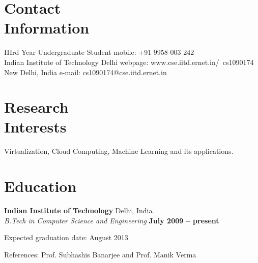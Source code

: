 \documentclass[margin,line]{resume}
\begin{document}
\begin{resume}

    \section{\mysidestyle Contact\\Information}

    IIIrd Year Undergraduate Student \hfill mobile: +91 9958 003 242 \vspace{0mm}\\\vspace{0mm}%
    Indian Institute of Technology Delhi \hfill webpage: www.cse.iitd.ernet.in/~cs1090174 \vspace{0mm}\\\vspace{0mm}%
    New Delhi, India \hfill e-mail: cs1090174@cse.iitd.ernet.in  \vspace{0mm}\\\vspace{-4.5mm}%


    \section{\mysidestyle Research\\Interests}

    Virtualization, Cloud Computing, Machine Learning and its applications.

    \section{\mysidestyle Education}

    \textbf{Indian Institute of Technology} Delhi, India \vspace{2mm}\\\vspace{1mm}%
    \textsl{B.Tech in Computer Science and Engineering} \hfill \textbf{ July 2009 -- present}\vspace{-3mm}\\\vspace{-1mm}%
    \begin{list2}
        \item Expected graduation date: August 2013
        \item References: Prof. Subhashis Banarjee and Prof. Manik Verma  
    \end{list2}\vspace{-1.5mm}


\end{resume}
\end{document}
